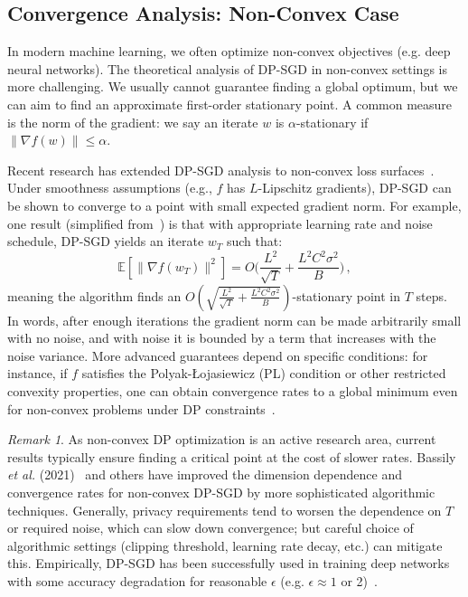\documentclass[11pt]{article}
\theoremstyle{remark}
\newtheorem{remark}{Remark}
\theoremstyle{definition}
\theoremstyle{plain}
\begin{document}
\subsection{Convergence Analysis: Non-Convex Case}

In modern machine learning, we often optimize non-convex objectives (e.g. deep neural networks). The theoretical analysis of DP-SGD in non-convex settings is more challenging. We usually cannot guarantee finding a global optimum, but we can aim to find an approximate first-order stationary point. A common measure is the norm of the gradient: we say an iterate $w$ is $\alpha$-stationary if $\|\nabla f(w)\| \le \alpha$.

Recent research has extended DP-SGD analysis to non-convex loss surfaces~\cite{Feldman2020, Bassily2021}. Under smoothness assumptions (e.g., $f$ has $L$-Lipschitz gradients), DP-SGD can be shown to converge to a point with small expected gradient norm. For example, one result (simplified from~\cite{Feldman2020}) is that with appropriate learning rate and noise schedule, DP-SGD yields an iterate $w_T$ such that:
\[
\mathbb{E}[\|\nabla f(w_T)\|^2] = O\Big(\frac{L^2}{\sqrt{T}} + \frac{L^2 C^2 \sigma^2}{B}\Big)\,,
\] 
meaning the algorithm finds an $O(\sqrt{\frac{L^2}{\sqrt{T}} + \frac{L^2 C^2 \sigma^2}{B}})$-stationary point in $T$ steps. In words, after enough iterations the gradient norm can be made arbitrarily small with no noise, and with noise it is bounded by a term that increases with the noise variance. More advanced guarantees depend on specific conditions: for instance, if $f$ satisfies the Polyak-\L{}ojasiewicz (PL) condition or other restricted convexity properties, one can obtain convergence rates to a global minimum even for non-convex problems under DP constraints~\cite{Tang2021}.

\begin{remark}
As non-convex DP optimization is an active research area, current results typically ensure finding a critical point at the cost of slower rates. Bassily \textit{et al.} (2021)~\cite{Bassily2021} and others have improved the dimension dependence and convergence rates for non-convex DP-SGD by more sophisticated algorithmic techniques. Generally, privacy requirements tend to worsen the dependence on $T$ or required noise, which can slow down convergence; but careful choice of algorithmic settings (clipping threshold, learning rate decay, etc.) can mitigate this. Empirically, DP-SGD has been successfully used in training deep networks with some accuracy degradation for reasonable $\epsilon$ (e.g. $\epsilon \approx 1$ or 2)~\cite{Abadi2016, Papernot2022}.
\end{remark}
\end{document}
